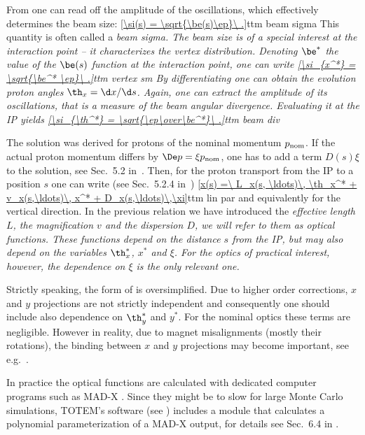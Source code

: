 From  one can read off the amplitude of the oscillations, which effectively determines the beam size:
\eqref{\si(s) = \sqrt{\be(s)\ep}\ .}{ttm beam sigma}
This quantity is often called a \em{beam sigma}. The beam size is of a special interest at the interaction point -- it characterizes the vertex distribution. Denoting $\be^*$ the value of the $\be(s)$ function at the interaction point, one can write
\eqref{\si_{x^*} = \sqrt{\be^* \ep}\ .}{ttm vertex sm}
By differentiating  one can obtain the evolution proton angles $\th_x = \d x/\d s$. Again, one can extract the amplitude of its oscillations, that is a measure of the beam angular divergence. Evaluating it at the IP yields
\eqref{\si_{\th^*} = \sqrt{\ep\over\be^*}\ .}{ttm beam div}

The solution  was derived for protons of the nominal momentum $p_{\rm nom}$. If the actual proton momentum differs by $\De p = \xi p_{\rm nom}$, one has to add a term $D(s) \xi$ to the solution, see Sec.~5.2 in~. Then, for the proton transport from the IP to a position $s$ one can write (see Sec.~5.2.4 in~)
\eqref{x(s) =\ L_x(s, \ldots)\, \th_x^* + v_x(s,\ldots)\, x^* + D_x(s,\ldots)\,\xi}{ttm lin par}
and equivalently for the vertical direction. In the previous relation we have introduced the \em{effective length} $L$, the \em{magnification} $v$ and the \em{dispersion} $D$, we will refer to them as \em{optical functions}. These functions depend on the distance $s$ from the IP, but may also depend on the variables $\th_x^*$, $x^*$ and $\xi$. For the optics of practical interest, however, the dependence on $\xi$ is the only relevant one.

Strictly speaking, the form of  is oversimplified. Due to higher order corrections, $x$ and $y$ projections are not strictly independent and consequently one should include also dependence on $\th_y^*$ and $y^*$. For the nominal optics these terms are negligible. However in reality, due to magnet misalignments (mostly their rotations), the binding between $x$ and $y$ projections may become important, see e.g.~.

In practice the optical functions are calculated with dedicated computer programs such as MAD-X . Since they might be to slow for large Monte Carlo simulations, TOTEM's software (see ) includes a module that calculates a polynomial parameterization of a MAD-X output, for details see Sec.~6.4 in .

